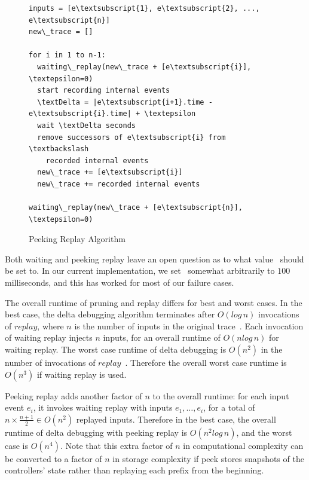 \begin{figure}
\begin{boxedminipage}{\linewidth}
\begin{Verbatim}[commandchars=\\\{\}]
inputs = [e\textsubscript{1}, e\textsubscript{2}, ..., e\textsubscript{n}]
new\_trace = []

for i in 1 to n-1:
  waiting\_replay(new\_trace + [e\textsubscript{i}], \textepsilon=0)
  start recording internal events
  \textDelta = |e\textsubscript{i+1}.time - e\textsubscript{i}.time| + \textepsilon
  wait \textDelta seconds
  remove successors of e\textsubscript{i} from \textbackslash
    recorded internal events
  new\_trace += [e\textsubscript{i}]
  new\_trace += recorded internal events

waiting\_replay(new\_trace + [e\textsubscript{n}], \textepsilon=0)
\end{Verbatim}
\end{boxedminipage}
\caption{Peeking Replay Algorithm}
\label{fig:peek}
\end{figure}

Both waiting and peeking replay leave an open question as to what value
\textepsilon~should be set to. In our current implementation,
we set \textepsilon~somewhat
arbitrarily to $100$ milliseconds, and this has worked for most of our
failure cases.

The overall runtime of pruning and replay differs for best and worst
cases. In the best case, the delta debugging algorithm terminates after
$O(log\,n)$
invocations of $replay$, where $n$ is the number of inputs in the original
trace~\cite{Zeller:2002:SIF:506201.506206}. Each invocation of waiting replay
injects $n$ inputs, for an overall runtime of $O(nlog\,n)$ for
waiting replay. The worst case runtime of delta debugging is $O(n^2)$ in the
number of invocations of $replay$~\cite{Zeller:2002:SIF:506201.506206}.
Therefore the overall worst case runtime is $O(n^3)$ if waiting replay is used.

Peeking replay adds another factor of $n$ to the overall runtime: for each input event
$e_i$, it invokes waiting replay with inputs $e_1,\dots,e_i$, for a total of
$n \times \frac{n+1}{2} \in O(n^2)$ replayed inputs. Therefore in the
best case, the overall runtime of delta debugging with peeking replay is
$O(n^2log\,n)$, and the worst case is $O(n^4)$. Note that this extra factor of
$n$ in computational complexity can be converted to a factor of $n$ in storage
complexity if peek stores snapshots of
the controllers' state rather than replaying each prefix from the beginning.

